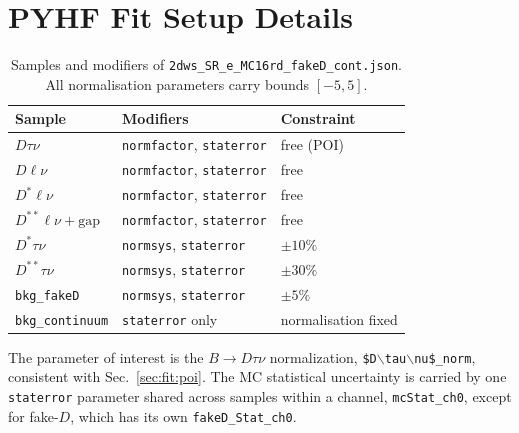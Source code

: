\section{PYHF Fit Setup Details}
\label{app:fit}


\begin{table}[htbp]
  \centering
  \caption{Samples and modifiers of
  \texttt{2dws\_SR\_e\_MC16rd\_fakeD\_cont.json}. All normalisation parameters
  carry bounds $[-5,5]$.}
  \label{tab:stored-modifiers}
  \small
  \begin{tabular}{l l l}
    \hline
    Sample & Modifiers & Constraint \\
    \hline
    $D\tau\nu$ & \texttt{normfactor}, \texttt{staterror} & free (POI) \\
    $D\ell\nu$ & \texttt{normfactor}, \texttt{staterror} & free \\
    $D^{*}\ell\nu$ & \texttt{normfactor}, \texttt{staterror} & free \\
    $D^{**}\ell\nu + \text{gap}$ & \texttt{normfactor}, \texttt{staterror} & free \\
    $D^{*}\tau\nu$ & \texttt{normsys}, \texttt{staterror} & $\pm 10\%$ \\
    $D^{**}\tau\nu$ & \texttt{normsys}, \texttt{staterror} & $\pm 30\%$ \\
    \texttt{bkg\_fakeD} & \texttt{normsys}, \texttt{staterror} & $\pm 5\%$ \\
    \texttt{bkg\_continuum} & \texttt{staterror} only & normalisation fixed \\
    \hline
  \end{tabular}
\end{table}

The parameter of interest is the $B \to D \tau \nu$ normalization,
\texttt{\$D$\backslash$tau$\backslash$nu\$\_norm}, consistent with
Sec.~\ref{sec:fit:poi}.
The MC statistical uncertainty is carried by one \texttt{staterror} parameter
shared across samples within a channel, \texttt{mcStat\_ch0}, except for
fake-$D$, which has its own \texttt{fakeD\_Stat\_ch0}.






